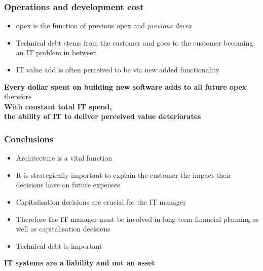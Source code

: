 \begin{frame}[fragile]
  \frametitle{Operations and development cost}
			\begin{itemize}
				\item opex is the function of previous opex and \emph{previous devex}
				\item Technical debt stems from the customer and goes to the customer becoming an IT problem in between 
				\item IT value add is often perceived to be via new added functionality
			\end{itemize}
			\begin{center}
\textbf{			Every dollar spent on building new software adds to all future opex}
\\[3mm]
therefore
\\[3mm]
\textbf{With constant total IT spend,\\ the ability of IT to deliver perceived value deteriorates}
			\end{center}
\end{frame}

\begin{frame}[fragile]
  \frametitle{Conclusions}
	\begin{itemize}
		\item Architecture is a vital function 
		\item It is strategically important to explain the customer the impact their decisions have on future expenses
		\item Capitalisation decisions are crucial for the IT manager
		\item Therefore the IT manager must be involved in long term financial planning as well as capitalisation decisions
		\item Technical debt is important
	\end{itemize}
	
	\begin{center}
			\textbf{IT systems are a liability and not an asset}
	\end{center}
\end{frame}


